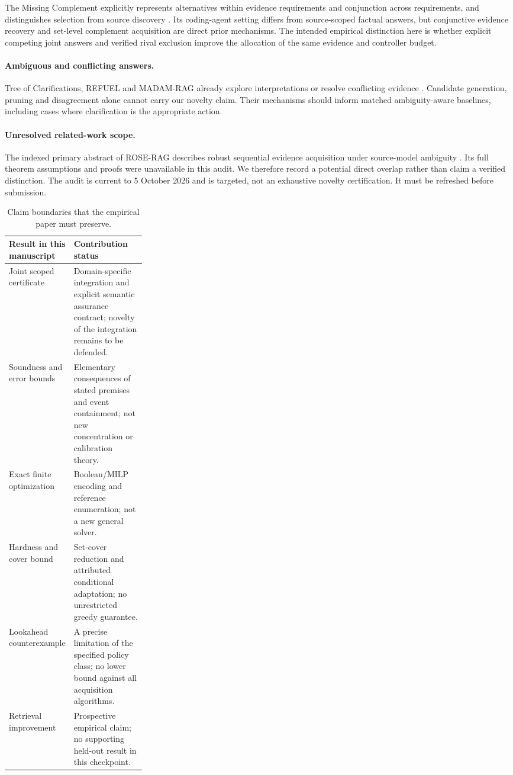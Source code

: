 The Missing Complement explicitly represents alternatives within evidence
requirements and conjunction across requirements, and distinguishes selection
from source discovery \citep{feng2026missing}. Its coding-agent setting differs
from source-scoped factual answers, but conjunctive evidence recovery and
set-level complement acquisition are direct prior mechanisms. The intended
empirical distinction here is whether explicit competing joint answers and
verified rival exclusion improve the allocation of the same evidence and
controller budget.

\paragraph{Ambiguous and conflicting answers.}
Tree of Clarifications, REFUEL and MADAM-RAG already explore interpretations
or resolve conflicting evidence
\citep{kim2023clarifications,gao2021refuel,wang2025madam}. Candidate generation,
pruning and disagreement alone cannot carry our novelty claim. Their
mechanisms should inform matched ambiguity-aware baselines, including cases
where clarification is the appropriate action.

\paragraph{Unresolved related-work scope.}
The indexed primary abstract of ROSE-RAG describes robust sequential evidence
acquisition under source-model ambiguity \citep{mokhtari2026roserag}. Its full
theorem assumptions and proofs were unavailable in this audit. We therefore
record a potential direct overlap rather than claim a verified distinction.
The audit is current to 5 October 2026 and is targeted, not an exhaustive
novelty certification. It must be refreshed before submission.

\begin{table}[ht]
\centering\small
\begin{tabularx}{\linewidth}{@{}p{0.27\linewidth}X@{}}
\toprule
Result in this manuscript & Contribution status \\
\midrule
Joint scoped certificate & Domain-specific integration and explicit semantic
assurance contract; novelty of the integration remains to be defended. \\
Soundness and error bounds & Elementary consequences of stated premises and
event containment; not new concentration or calibration theory. \\
Exact finite optimization & Boolean/MILP encoding and reference enumeration;
not a new general solver. \\
Hardness and cover bound & Set-cover reduction and attributed conditional
adaptation; no unrestricted greedy guarantee. \\
Lookahead counterexample & A precise limitation of the specified policy class;
no lower bound against all acquisition algorithms. \\
Retrieval improvement & Prospective empirical claim; no supporting held-out
result in this checkpoint. \\
\bottomrule
\end{tabularx}
\caption{Claim boundaries that the empirical paper must preserve.}
\end{table}
